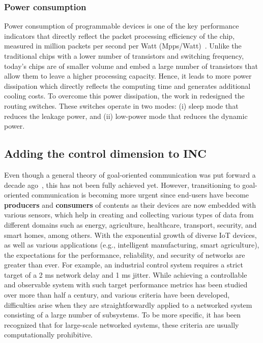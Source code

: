 \subsubsection{Power consumption} Power consumption of programmable devices is one of the key performance indicators that directly reflect the packet processing efficiency of the chip,  measured in million packets per second per Watt (Mpps/Watt)~\cite{pongracz2013cheap}.
Unlike the traditional chips with a lower number of transistors and switching frequency, today’s chips are of smaller volume and embed a large number of transistors that allow them to leave a higher processing capacity. Hence, it leads to more power dissipation which directly reflects the computing time and generates additional cooling costs. To overcome this power dissipation, the work in \cite{yang2019switchagg} redesigned the routing switches. These switches operate in two modes: (i) sleep mode that reduces the leakage power, and (ii) low-power mode that reduces the dynamic power.


\subsection{Adding the control dimension to INC}
\noindent Even though a general theory of goal-oriented communication was put forward a decade ago~\cite{10.1145/2160158.2160161}, this has not been fully achieved yet. However, transitioning to goal-oriented communication is becoming more urgent since end-users have become \textbf{producers} and \textbf{consumers} of contents as their devices are now embedded with various sensors, which help in creating and collecting various types of data from different domains such as energy, agriculture, healthcare, transport, security, and smart homes, among others.  With the exponential growth of diverse IoT devices, as well as various applications (e.g., intelligent manufacturing, smart agriculture), the expectations for the performance, reliability, and security of networks are greater than ever. For example, an industrial control system requires a strict target of a 2 ms network delay and 1 ms jitter. While achieving a controllable and observable system with such target performance metrics has been studied over more than half a century, and various criteria have been developed, difficulties arise when they are straightforwardly applied to a networked system consisting of a large number of subsystems. To be more specific, it has been recognized that for large-scale networked systems, these criteria are usually computationally prohibitive.

